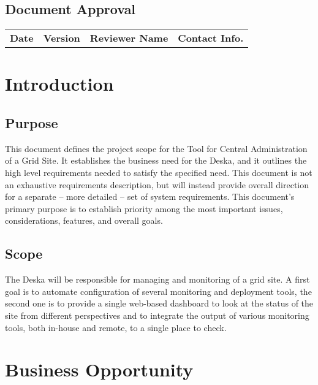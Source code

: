 \documentclass[12pt]{article}
\begin{document}
\subsection*{Document Approval}

\begin{table}[!h]
	\begin{tabular}{l l l l}
		\textbf{Date} & \textbf{Version} & \textbf{Reviewer Name} & \textbf{Contact Info.} \\
	\end{tabular}
	\label{tab:DocumentApproval}
\end{table}


\newpage

\tableofcontents

\newpage

\section{Introduction}

\subsection{Purpose}
This document defines the project scope for the Tool for Central Administration of a Grid Site. It establishes the business need for 
the Deska, and it outlines the high level requirements needed to satisfy the specified need. This document is not an exhaustive 
requirements description, but will instead provide overall direction for a separate -- more detailed -- set of system requirements. 
This document's primary purpose is to establish priority among the most important issues, considerations, features, and overall goals.

\subsection{Scope}
The Deska will be responsible for managing and monitoring of a grid site. A
first goal is to automate configuration of several monitoring and deployment
tools, the second one is to provide a single web-based dashboard to look at the
status of the site from different perspectives and to integrate the output of
various monitoring tools, both in-house and remote, to a single place to check.


\section{Business Opportunity}
\end{document}
